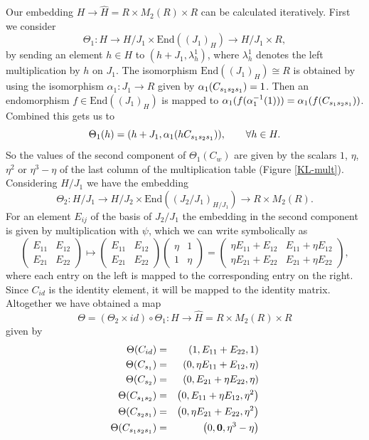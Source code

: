\documentclass[oneside, a4paper, 11pt]{amsart}
\begin{document}
Our embedding $H \to \widehat{H} = R \times M_2(R) \times R$ can be calculated
iteratively.
First we consider $$\Theta_1: H \to H/J_1 \times \mathrm{End}((J_1)_{H}) \to
H/J_1 \times R,$$ by sending an element $h\in H$ to $(h+J_1, \lambda_h^1)$,
where $\lambda_h^1$ denotes the left multiplication by $h$ on $J_1$. The
isomorphism $\mathrm{End}({(J_1)}_{H})\cong R$ is obtained by using the
isomorphism $\alpha_1:J_1\to R$ given by $\alpha_1(C_{s_1s_2s_1}) = 1$. Then an
endomorphism $f\in \mathrm{End}({(J_1)}_{H})$ is mapped to
$\alpha_1(f(\alpha_1^{-1}(1))) = \alpha_1(f(C_{s_1s_2s_1}))$. Combined this gets us to
$$\Theta_1(h) = (h+J_1, \alpha_1(hC_{s_1s_2s_1})), \qquad \forall h\in H.$$
So the values of the second component of $\Theta_1(C_{w})$ are given by the
scalars $1$, $\eta$, $\eta^2$ or $\eta^3-\eta$ of the last column of the
multiplication table (Figure \ref{KL-mult}).
Considering $H/J_1$ we have the embedding
$$\Theta_2: H/J_1 \to H/J_2 \times \mathrm{End}((J_2/J_1)_{H/J_1}) \to R
\times M_2(R).$$
For an element $E_{ij}$ of the basis of $J_2/J_1$ the embedding in the second
component is given by multiplication with $\psi$, which we can write
symbolically as
$$\left(\begin{array}{cc}
         E_{11} & E_{12} \\ E_{21} & E_{22}
        \end{array}\right)
        \mapsto
        \left(\begin{array}{cc}
         E_{11} & E_{12} \\ E_{21} & E_{22}
        \end{array}\right)
        \left(\begin{array}{cc}
         \eta & 1 \\ 1 & \eta
        \end{array}\right)
        =
        \left(\begin{array}{cc}
         \eta E_{11} + E_{12} & E_{11} + \eta E_{12} \\ \eta E_{21}+E_{22} & E_{21}+\eta E_{22}
        \end{array}\right),$$
      where each entry on the left  is mapped to the corresponding entry on
      the right. Since $C_{id}$ is the identity element, it will be mapped to the
      identity matrix. Altogether we have obtained a map 
        \begin{equation}
          \Theta = (\Theta_2 \times id)\circ \Theta_1: H \to \widehat{H} =
          R \times M_2(R) \times R
        \end{equation} given by
\begin{eqnarray*}
 \Theta(C_{id})  &=& \left( 1, E_{11}+E_{22}, 1 \right) \\
 \Theta(C_{s_1})  &=& \left( 0, \eta E_{11} + E_{12}, \eta \right)\\
 \Theta(C_{s_2})  &=& \left( 0, E_{21}+\eta E_{22}, \eta \right) \\
 \Theta(C_{s_1s_2})  &=& \left( 0, E_{11} + \eta E_{12}, \eta^2 \right) \\
 \Theta(C_{s_2s_1})  &=& \left( 0, \eta E_{21}+E_{22}, \eta^2 \right) \\
 \Theta(C_{s_1s_2s_1})  &=& \left( 0, \mathbf{0}, \eta^3-\eta \right) \end{eqnarray*}
\end{document}

